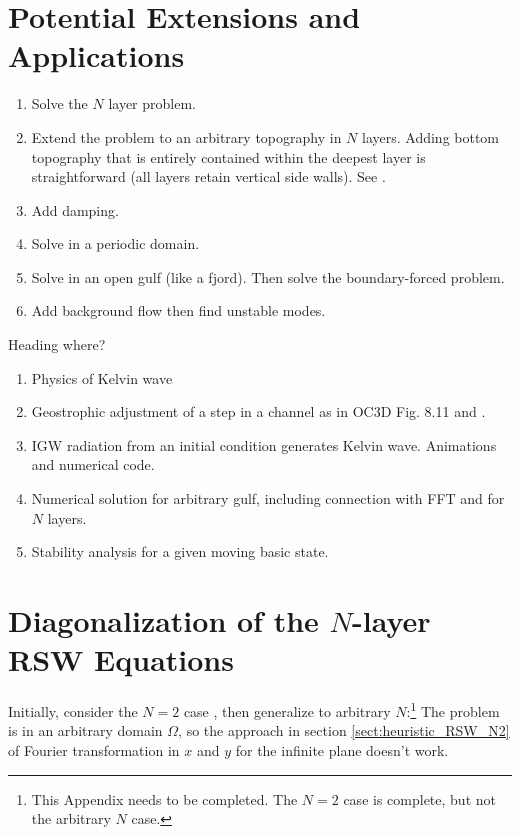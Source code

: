 \documentclass[10pt,reqno]{amsart}
\begin{document}
\section{Potential Extensions and Applications}
\begin{enumerate}
\item Solve the $N$ layer problem.
\item Extend the problem to an arbitrary topography in $N$ layers. 
Adding bottom topography that is entirely contained within the deepest layer is straightforward (all layers retain vertical side walls).
See \citep{vallis06}.
\item Add damping.
\item Solve in a periodic domain.
\item Solve in an open gulf (like a fjord). Then solve the boundary-forced problem.
\item Add background flow then find unstable modes.
\end{enumerate}

Heading where?  
\begin{enumerate}
\item Physics of Kelvin wave
\item Geostrophic adjustment of a step in a channel as in OC3D Fig. 8.11 and \citet{wajsowicz&gill86}.
\item IGW radiation from an initial condition generates Kelvin wave. Animations and numerical code.
\item Numerical solution for arbitrary gulf, including connection with FFT and for $N$ layers.
\item Stability analysis for a given moving basic state.
\end{enumerate}

\clearpage
\appendix

\section{Diagonalization of the $N$-layer RSW Equations}
\label{app:Nlayer_diagonalization}
Initially, consider the $N=2$ case \citep{ring09}, then generalize to arbitrary $N$:\footnote{This Appendix needs to be completed. The $N=2$ case is complete, but not the arbitrary $N$ case.}
The problem is in an arbitrary domain $\Omega$, so the approach in section \ref{sect:heuristic_RSW_N2} of Fourier transformation in $x$ and $y$ for the infinite plane doesn't work.
\end{document}
